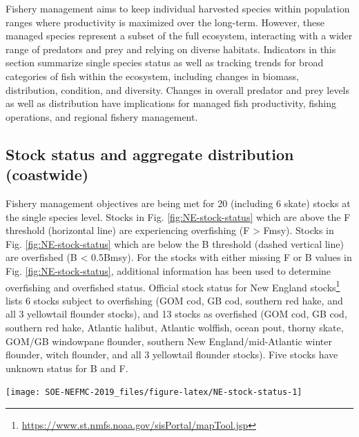 \documentclass[10pt,]{article}
\let\rmarkdownfootnote\footnote%
\def\footnote{\protect\rmarkdownfootnote}
\let\origfigure\figure
\let\endorigfigure\endfigure
\renewenvironment{figure}[1][2] {
    \expandafter\origfigure\expandafter[H]
} {
    \endorigfigure
}
\begin{document}
Fishery management aims to keep individual harvested species within
population ranges where productivity is maximized over the long-term.
However, these managed species represent a subset of the full ecosystem,
interacting with a wider range of predators and prey and relying on
diverse habitats. Indicators in this section summarize single species
status as well as tracking trends for broad categories of fish within
the ecosystem, including changes in biomass, distribution, condition,
and diversity. Changes in overall predator and prey levels as well as
distribution have implications for managed fish productivity, fishing
operations, and regional fishery management.

\subsection{Stock status and aggregate distribution
(coastwide)}\label{stock-status-and-aggregate-distribution-coastwide}

Fishery management objectives are being met for 20 (including 6 skate)
stocks at the single species level. Stocks in Fig.
\ref{fig:NE-stock-status} which are above the F threshold (horizontal
line) are experiencing overfishing (F \textgreater{} Fmsy). Stocks in
Fig. \ref{fig:NE-stock-status} which are below the B threshold (dashed
vertical line) are overfished (B \textless{} 0.5Bmsy). For the stocks
with either missing F or B values in Fig. \ref{fig:NE-stock-status},
additional information has been used to determine overfishing and
overfished status. Official stock status for New England
stocks\footnote{\url{https://www.st.nmfs.noaa.gov/sisPortal/mapTool.jsp}}
lists 6 stocks subject to overfishing (GOM cod, GB cod, southern red
hake, and all 3 yellowtail flounder stocks), and 13 stocks as overfished
(GOM cod, GB cod, southern red hake, Atlantic halibut, Atlantic
wolffish, ocean pout, thorny skate, GOM/GB windowpane flounder, southern
New England/mid-Atlantic winter flounder, witch flounder, and all 3
yellowtail flounder stocks). Five stocks have unknown status for B and
F.

\begin{figure}

{\centering \texttt{[image: SOE-NEFMC-2019\_files/figure-latex/NE-stock-status-1]} 

}

\caption{Summary of single species status for NEFMC and jointly managed stocks. \label{stock-status}}\label{fig:NE-stock-status}
\end{figure}
\end{document}
